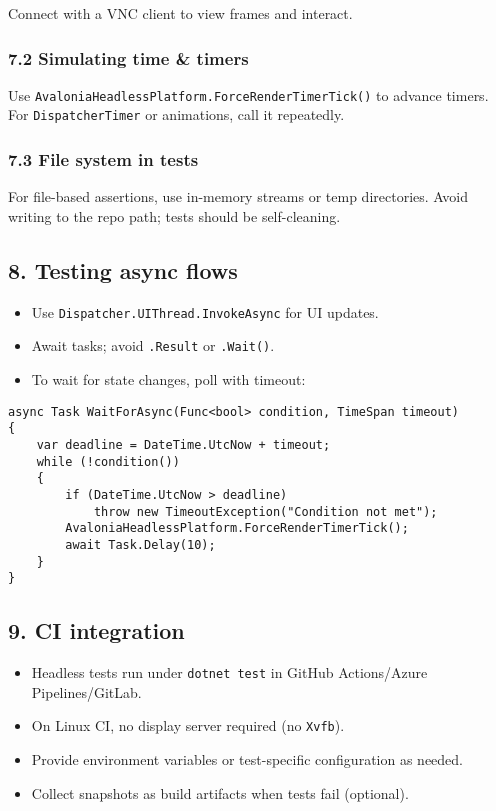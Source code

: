 Connect with a VNC client to view frames and interact.

\subsubsection{7.2 Simulating time \&
timers}\label{simulating-time-timers}

Use
\passthrough{\lstinline!AvaloniaHeadlessPlatform.ForceRenderTimerTick()!}
to advance timers. For \passthrough{\lstinline!DispatcherTimer!} or
animations, call it repeatedly.

\subsubsection{7.3 File system in tests}\label{file-system-in-tests}

For file-based assertions, use in-memory streams or temp directories.
Avoid writing to the repo path; tests should be self-cleaning.

\subsection{8. Testing async flows}\label{testing-async-flows}

\begin{itemize}
\tightlist
\item
  Use \passthrough{\lstinline!Dispatcher.UIThread.InvokeAsync!} for UI
  updates.
\item
  Await tasks; avoid \passthrough{\lstinline!.Result!} or
  \passthrough{\lstinline!.Wait()!}.
\item
  To wait for state changes, poll with timeout:
\end{itemize}

\begin{lstlisting}
async Task WaitForAsync(Func<bool> condition, TimeSpan timeout)
{
    var deadline = DateTime.UtcNow + timeout;
    while (!condition())
    {
        if (DateTime.UtcNow > deadline)
            throw new TimeoutException("Condition not met");
        AvaloniaHeadlessPlatform.ForceRenderTimerTick();
        await Task.Delay(10);
    }
}
\end{lstlisting}

\subsection{9. CI integration}\label{ci-integration}

\begin{itemize}
\tightlist
\item
  Headless tests run under \passthrough{\lstinline!dotnet test!} in
  GitHub Actions/Azure Pipelines/GitLab.
\item
  On Linux CI, no display server required (no
  \passthrough{\lstinline!Xvfb!}).
\item
  Provide environment variables or test-specific configuration as
  needed.
\item
  Collect snapshots as build artifacts when tests fail (optional).
\end{itemize}

